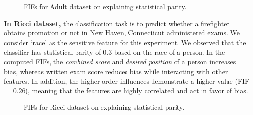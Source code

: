 \begin{figure}[!t]
	\begin{minipage}{0.45\textwidth}
		\centering
	\end{minipage}
	\begin{minipage}{0.5\textwidth}
		\centering
	\end{minipage}
	\vspace{-0.2em}
	\caption{FIFs for Adult dataset on explaining statistical parity. }\label{fig:individual_vs_intersectional_influence_adult}
	
\end{figure}



\textbf{In Ricci dataset,} the classification task  is to predict whether a firefighter obtains promotion or not in New Haven, Connecticut administered exams. We consider `race' as the sensitive feature for this experiment. We observed that the classifier has statistical parity of $ 0.3 $ based on the race of a person. In the computed FIFs, the \textit{combined score} and \textit{desired position} of a person increases bias, whereas written exam score reduces bias while interacting with other features. In addition, the higher order influences demonstrate a higher value (FIF $ = 0.26 $), meaning that the features are highly correlated and act in favor of bias.

\begin{figure}[h!]
	\begin{minipage}{0.45\textwidth}
		\centering
	\end{minipage}
	\begin{minipage}{0.5\textwidth}
		\centering
	\end{minipage}
	\vspace{-0.2em}
	\caption{FIFs for Ricci dataset on explaining statistical parity.}\label{fig:individual_vs_intersectional_influence_ricci}
	
\end{figure}

